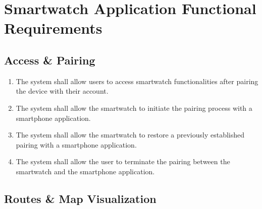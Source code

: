 \newpage
\section{Smartwatch Application Functional Requirements}

\subsection{Access \& Pairing}

\begin{enumerate}[label=\textbf{FR\arabic*}, ref=FR\arabic*]

\item \label{fr-watch:fr1}
The system shall allow users to access smartwatch functionalities after pairing the device with their account.

\item \label{fr-watch:fr2}
The system shall allow the smartwatch to initiate the pairing process with a smartphone application.

\item \label{fr-watch:fr3}
The system shall allow the smartwatch to restore a previously established pairing with a smartphone application.

\item \label{fr-watch:fr4}
The system shall allow the user to terminate the pairing between the smartwatch and the smartphone application.

\end{enumerate}


\subsection{Routes \& Map Visualization}

